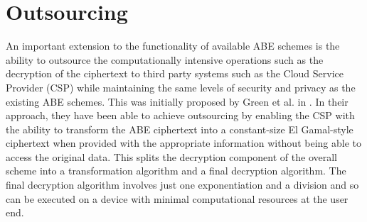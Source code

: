 


\section{Outsourcing}

An important extension to the functionality of available ABE schemes is the ability to outsource the computationally intensive operations such as the decryption of the ciphertext to third party systems such as the Cloud Service Provider (CSP) while maintaining the same levels of security and privacy as the existing ABE schemes. This was initially proposed by Green et al. in \cite{Green2011outsource}. In their approach, they have been able to achieve outsourcing by enabling the CSP with the ability to transform the ABE ciphertext into a constant-size El Gamal-style ciphertext when provided with the appropriate information without being able to access the original data. This splits the decryption component of the overall scheme into a transformation algorithm and a final decryption algorithm. The final decryption algorithm involves just one exponentiation and a division and so can be executed on a device with minimal computational resources at the user end.

